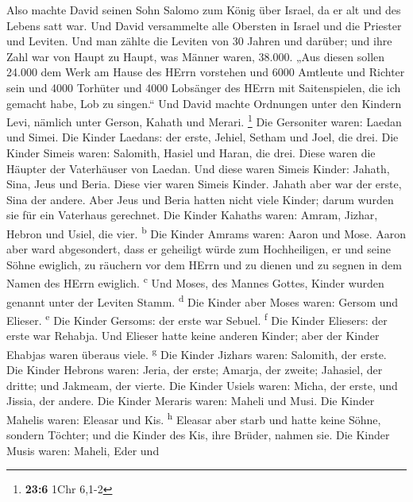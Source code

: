  Also machte David seinen Sohn Salomo zum König über
Israel, da er alt und des Lebens satt war.  Und David
versammelte alle Obersten in Israel und die Priester und Leviten.
 Und man zählte die Leviten von 30 Jahren und darüber; und
ihre Zahl war von Haupt zu Haupt, was Männer waren, 38.000.
 „Aus diesen sollen 24.000 dem Werk am Hause des HErrn
vorstehen und 6000 Amtleute und Richter sein  und 4000
Torhüter und 4000 Lobsänger des HErrn mit Saitenspielen, die ich gemacht
habe, Lob zu singen.``  Und David machte Ordnungen unter
den Kindern Levi, nämlich unter Gerson, Kahath und Merari. \footnote{\textbf{23:6}
  1Chr 6,1-2}  Die Gersoniter waren: Laedan und Simei.
 Die Kinder Laedans: der erste, Jehiel, Setham und Joel,
die drei.  Die Kinder Simeis waren: Salomith, Hasiel und
Haran, die drei. Diese waren die Häupter der Vaterhäuser von Laedan.
 Und diese waren Simeis Kinder: Jahath, Sina, Jeus und
Beria. Diese vier waren Simeis Kinder.  Jahath aber war
der erste, Sina der andere. Aber Jeus und Beria hatten nicht viele
Kinder; darum wurden sie für ein Vaterhaus gerechnet. 
Die Kinder Kahaths waren: Amram, Jizhar, Hebron und Usiel, die vier.
\textsuperscript{b}  Die Kinder Amrams waren: Aaron und
Mose. Aaron aber ward abgesondert, dass er geheiligt würde zum
Hochheiligen, er und seine Söhne ewiglich, zu räuchern vor dem HErrn und
zu dienen und zu segnen in dem Namen des HErrn ewiglich.
\textsuperscript{c}  Und Moses, des Mannes Gottes, Kinder
wurden genannt unter der Leviten Stamm. \textsuperscript{d}
 Die Kinder aber Moses waren: Gersom und Elieser.
\textsuperscript{e}  Die Kinder Gersoms: der erste war
Sebuel. \textsuperscript{f}  Die Kinder Eliesers: der
erste war Rehabja. Und Elieser hatte keine anderen Kinder; aber der
Kinder Ehabjas waren überaus viele. \textsuperscript{g} 
Die Kinder Jizhars waren: Salomith, der erste.  Die
Kinder Hebrons waren: Jeria, der erste; Amarja, der zweite; Jahasiel,
der dritte; und Jakmeam, der vierte.  Die Kinder Usiels
waren: Micha, der erste, und Jissia, der andere.  Die
Kinder Meraris waren: Maheli und Musi. Die Kinder Mahelis waren: Eleasar
und Kis. \textsuperscript{h}  Eleasar aber starb und
hatte keine Söhne, sondern Töchter; und die Kinder des Kis, ihre Brüder,
nahmen sie.  Die Kinder Musis waren: Maheli, Eder und
